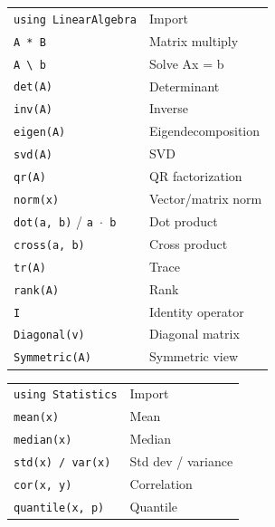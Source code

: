\documentclass[10pt]{extarticle}
\begin{document}
\begin{multicols}{2}

\begin{tabularx}{\linewidth}{@{}l@{\enspace}Y@{}}
\texttt{using LinearAlgebra}        & Import \\
\texttt{A * B}                      & Matrix multiply \\
\texttt{A \textbackslash{} b}       & Solve Ax = b \\
\texttt{det(A)}                     & Determinant \\
\texttt{inv(A)}                     & Inverse \\
\texttt{eigen(A)}                   & Eigen\-decomposition \\
\texttt{svd(A)}                     & SVD \\
\texttt{qr(A)}                     & QR factorization \\
\texttt{norm(x)}                    & Vector/matrix norm \\
\texttt{dot(a, b)} / \texttt{a $\cdot$ b}  & Dot product \\
\texttt{cross(a, b)}               & Cross product \\
\texttt{tr(A)}                      & Trace \\
\texttt{rank(A)}                    & Rank \\
\texttt{I}                          & Identity operator \\
\texttt{Diagonal(v)}               & Diagonal matrix \\
\texttt{Symmetric(A)}              & Symmetric view \\
\end{tabularx}

\begin{tabularx}{\linewidth}{@{}l@{\enspace}Y@{}}
\texttt{using Statistics}            & Import \\
\texttt{mean(x)}                     & Mean \\
\texttt{median(x)}                   & Median \\
\texttt{std(x) / var(x)}           & Std dev / variance \\
\texttt{cor(x, y)}                  & Correlation \\
\texttt{quantile(x, p)}            & Quantile \\
\end{tabularx}


\end{multicols}
\end{document}
